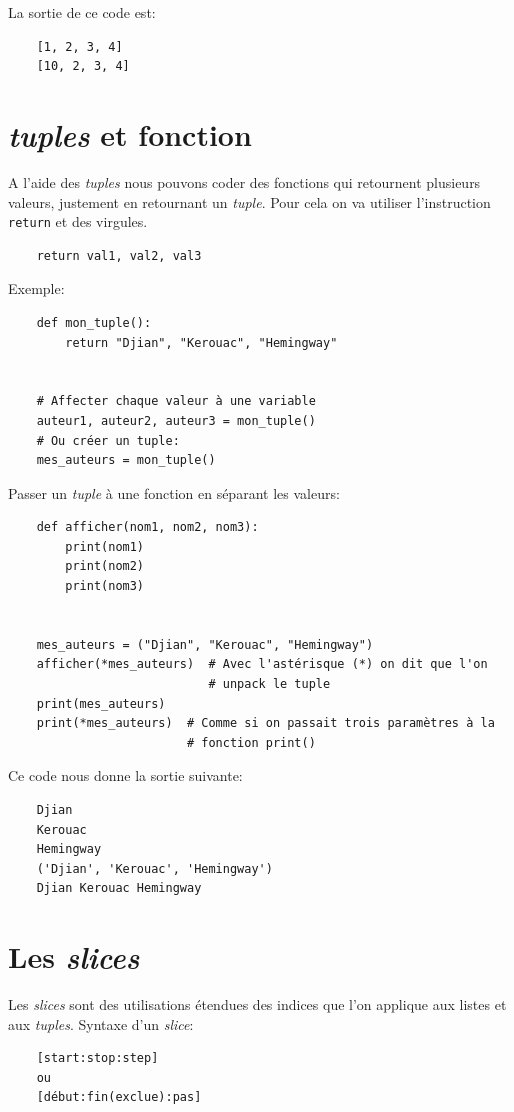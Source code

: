 \documentclass[a4paper,11pt]{book}
\begin{document}
La sortie de ce code est:
\begin{verbatim}
    [1, 2, 3, 4]
    [10, 2, 3, 4]
\end{verbatim}
\medskip

\section{\textit{tuples} et fonction}
A l'aide des \textit{tuples} nous pouvons coder des fonctions qui retournent plusieurs valeurs, justement en retournant un \textit{tuple}. Pour cela on va utiliser l'instruction \texttt{return} et des virgules.
\begin{verbatim}
    return val1, val2, val3
\end{verbatim}
\medskip

Exemple:
\begin{lstlisting}
    def mon_tuple():
        return "Djian", "Kerouac", "Hemingway"
    
    
    # Affecter chaque valeur à une variable
    auteur1, auteur2, auteur3 = mon_tuple()
    # Ou créer un tuple:
    mes_auteurs = mon_tuple()
\end{lstlisting}
\medskip

Passer un \textit{tuple} à une fonction en séparant les valeurs:
\begin{lstlisting}
    def afficher(nom1, nom2, nom3):
        print(nom1)
        print(nom2)
        print(nom3)
    
    
    mes_auteurs = ("Djian", "Kerouac", "Hemingway")
    afficher(*mes_auteurs)  # Avec l'astérisque (*) on dit que l'on 
                            # unpack le tuple
    print(mes_auteurs)
    print(*mes_auteurs)  # Comme si on passait trois paramètres à la 
                         # fonction print()
\end{lstlisting}
\medskip

Ce code nous donne la sortie suivante:
\begin{verbatim}
    Djian
    Kerouac 
    Hemingway
    ('Djian', 'Kerouac', 'Hemingway')
    Djian Kerouac Hemingway
\end{verbatim}
\medskip

\section{Les \textit{slices}}
Les \textit{slices} sont des utilisations étendues des indices que l'on applique aux listes et aux \textit{tuples}. Syntaxe d'un \textit{slice}:
\begin{verbatim}
    [start:stop:step]
    ou
    [début:fin(exclue):pas]
\end{verbatim}
\medskip
\end{document}
